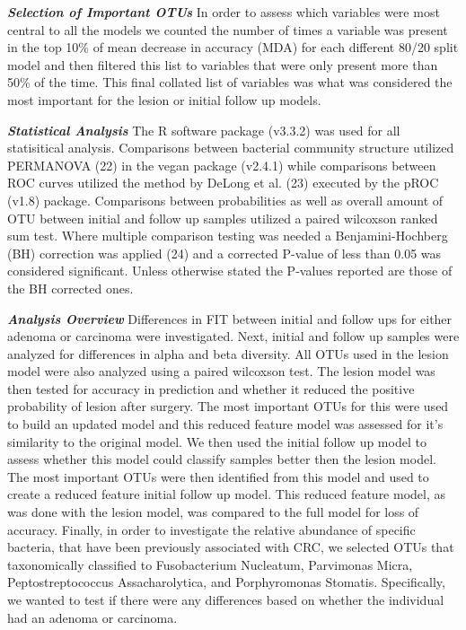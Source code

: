 \documentclass[12pt,]{article}
\begin{document}
\textbf{\emph{Selection of Important OTUs}} In order to assess which
variables were most central to all the models we counted the number of
times a variable was present in the top 10\% of mean decrease in
accuracy (MDA) for each different 80/20 split model and then filtered
this list to variables that were only present more than 50\% of the
time. This final collated list of variables was what was considered the
most important for the lesion or initial follow up models.

\textbf{\emph{Statistical Analysis}} The R software package (v3.3.2) was
used for all statisitical analysis. Comparisons between bacterial
community structure utilized PERMANOVA (22) in the vegan package
(v2.4.1) while comparisons between ROC curves utilized the method by
DeLong et al. (23) executed by the pROC (v1.8) package. Comparisons
between probabilities as well as overall amount of OTU between initial
and follow up samples utilized a paired wilcoxson ranked sum test. Where
multiple comparison testing was needed a Benjamini-Hochberg (BH)
correction was applied (24) and a corrected P-value of less than 0.05
was considered significant. Unless otherwise stated the P-values
reported are those of the BH corrected ones.

\textbf{\emph{Analysis Overview}} Differences in FIT between initial and
follow ups for either adenoma or carcinoma were investigated. Next,
initial and follow up samples were analyzed for differences in alpha and
beta diversity. All OTUs used in the lesion model were also analyzed
using a paired wilcoxson test. The lesion model was then tested for
accuracy in prediction and whether it reduced the positive probability
of lesion after surgery. The most important OTUs for this were used to
build an updated model and this reduced feature model was assessed for
it's similarity to the original model. We then used the initial follow
up model to assess whether this model could classify samples better then
the lesion model. The most important OTUs were then identified from this
model and used to create a reduced feature initial follow up model. This
reduced feature model, as was done with the lesion model, was compared
to the full model for loss of accuracy. Finally, in order to investigate
the relative abundance of specific bacteria, that have been previously
associated with CRC, we selected OTUs that taxonomically classified to
Fusobacterium Nucleatum, Parvimonas Micra, Peptostreptococcus
Assacharolytica, and Porphyromonas Stomatis. Specifically, we wanted to
test if there were any differences based on whether the individual had
an adenoma or carcinoma.
\end{document}
